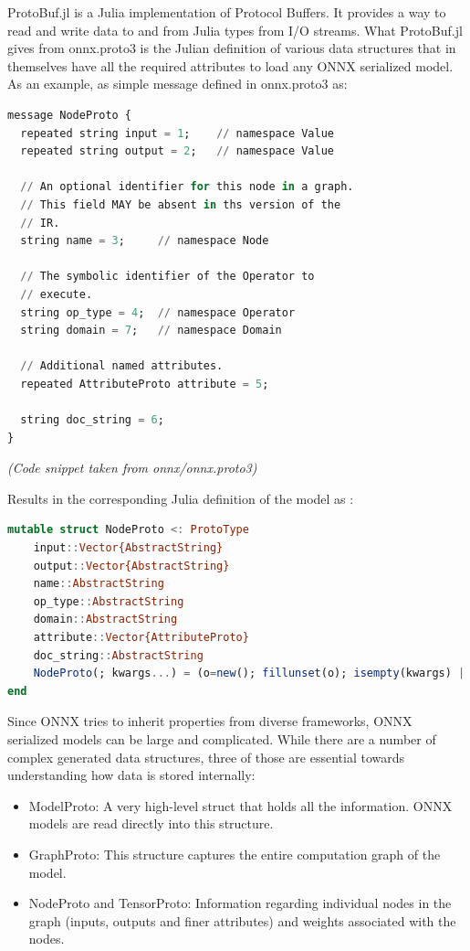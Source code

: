 \documentclass{juliacon}
\begin{document}
  

ProtoBuf.jl \cite{Protobuf.jl} is a Julia implementation of Protocol Buffers. It provides a way to read and write data to and 
from Julia types from I/O streams. What ProtoBuf.jl gives from onnx.proto3 is the Julian definition of various
data structures that in themselves have all the required attributes to load any ONNX serialized model. As an 
example, as simple message defined in onnx.proto3 as:

\begin{lstlisting}[language=julia]
message NodeProto {
  repeated string input = 1;    // namespace Value
  repeated string output = 2;   // namespace Value

  // An optional identifier for this node in a graph.
  // This field MAY be absent in ths version of the
  // IR.
  string name = 3;     // namespace Node

  // The symbolic identifier of the Operator to 
  // execute.
  string op_type = 4;  // namespace Operator
  string domain = 7;   // namespace Domain

  // Additional named attributes.
  repeated AttributeProto attribute = 5;

  string doc_string = 6;
}
\end{lstlisting}{}
\textit{(Code snippet taken from onnx/onnx.proto3)}  

Results in the corresponding Julia definition of the model as :

\begin{lstlisting}[language=julia]
mutable struct NodeProto <: ProtoType
    input::Vector{AbstractString}
    output::Vector{AbstractString}
    name::AbstractString
    op_type::AbstractString
    domain::AbstractString
    attribute::Vector{AttributeProto}
    doc_string::AbstractString
    NodeProto(; kwargs...) = (o=new(); fillunset(o); isempty(kwargs) || ProtoBuf._protobuild(o, kwargs); o)
end
\end{lstlisting}

Since ONNX tries to inherit properties from diverse frameworks, ONNX serialized models can be large and complicated. While there are a number of complex generated data structures, three of those are essential towards
understanding how data is stored internally: 

\begin{itemize}
    \item ModelProto: A very high-level struct that holds all the information. ONNX models are read directly into
            this structure.
    \item GraphProto: This structure captures the entire computation graph of the model.
    \item NodeProto and TensorProto: Information regarding individual nodes in the graph (inputs, outputs and finer attributes) and weights associated with the nodes.
\end{itemize}
\end{document}
